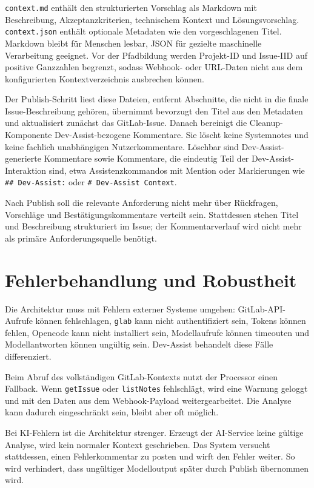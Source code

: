 \documentclass[12pt,a4paper,oneside]{scrreprt}
\begin{document}
\texttt{context.md} enthält den strukturierten Vorschlag als Markdown mit Beschreibung, Akzeptanzkriterien, technischem Kontext und Lösungsvorschlag. \texttt{context.json} enthält optionale Metadaten wie den vorgeschlagenen Titel. Markdown bleibt für Menschen lesbar, JSON für gezielte maschinelle Verarbeitung geeignet. Vor der Pfadbildung werden Projekt-ID und Issue-IID auf positive Ganzzahlen begrenzt, sodass Webhook- oder URL-Daten nicht aus dem konfigurierten Kontextverzeichnis ausbrechen können.

Der Publish-Schritt liest diese Dateien, entfernt Abschnitte, die nicht in die finale Issue-Beschreibung gehören, übernimmt bevorzugt den Titel aus den Metadaten und aktualisiert zunächst das GitLab-Issue. Danach bereinigt die Cleanup-Komponente Dev-Assist-bezogene Kommentare. Sie löscht keine Systemnotes und keine fachlich unabhängigen Nutzerkommentare. Löschbar sind Dev-Assist-generierte Kommentare sowie Kommentare, die eindeutig Teil der Dev-Assist-Interaktion sind, etwa Assistenzkommandos mit Mention oder Markierungen wie \texttt{\#\# Dev-Assist:} oder \texttt{\# Dev-Assist Context}.

Nach Publish soll die relevante Anforderung nicht mehr über Rückfragen, Vorschläge und Bestätigungskommentare verteilt sein. Stattdessen stehen Titel und Beschreibung strukturiert im Issue; der Kommentarverlauf wird nicht mehr als primäre Anforderungsquelle benötigt.

\section{Fehlerbehandlung und Robustheit}

Die Architektur muss mit Fehlern externer Systeme umgehen: GitLab-API-Aufrufe können fehlschlagen, \texttt{glab} kann nicht authentifiziert sein, Tokens können fehlen, Opencode kann nicht installiert sein, Modellaufrufe können timeouten und Modellantworten können ungültig sein. Dev-Assist behandelt diese Fälle differenziert.

Beim Abruf des vollständigen GitLab-Kontexts nutzt der Processor einen Fallback. Wenn \texttt{getIssue} oder \texttt{listNotes} fehlschlägt, wird eine Warnung geloggt und mit den Daten aus dem Webhook-Payload weitergearbeitet. Die Analyse kann dadurch eingeschränkt sein, bleibt aber oft möglich.

Bei KI-Fehlern ist die Architektur strenger. Erzeugt der AI-Service keine gültige Analyse, wird kein normaler Kontext geschrieben. Das System versucht stattdessen, einen Fehlerkommentar zu posten und wirft den Fehler weiter. So wird verhindert, dass ungültiger Modelloutput später durch Publish übernommen wird.
\end{document}
